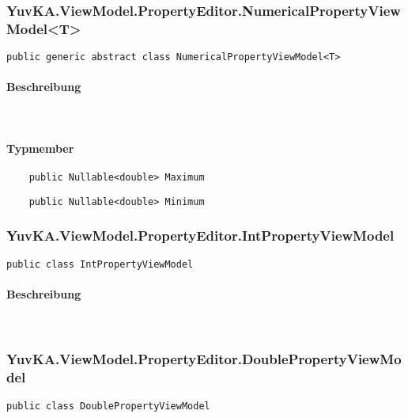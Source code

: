 \subsubsection{YuvKA.ViewModel.PropertyEditor.NumericalPropertyViewModel<T>}

\begin{verbatim}
public generic abstract class NumericalPropertyViewModel<T>
\end{verbatim}

\paragraph{Beschreibung}~\\
\paragraph{Typmember}
\begin{itemize}

	\begin{verbatim}
	public Nullable<double> Maximum
	\end{verbatim}

	\begin{verbatim}
	public Nullable<double> Minimum
	\end{verbatim}

\end{itemize}




\subsubsection{YuvKA.ViewModel.PropertyEditor.IntPropertyViewModel}

\begin{verbatim}
public class IntPropertyViewModel
\end{verbatim}

\paragraph{Beschreibung}~\\




\subsubsection{YuvKA.ViewModel.PropertyEditor.DoublePropertyViewModel}

\begin{verbatim}
public class DoublePropertyViewModel
\end{verbatim}

